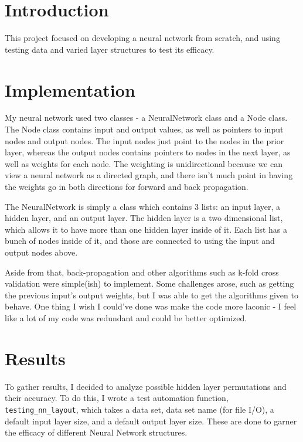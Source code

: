 \documentclass[12pt]{extarticle}
\begin{document}
\maketitle

\section{Introduction}
This project focused on developing a neural network from scratch, and using testing data and varied layer structures to test its efficacy.

\section{Implementation}
My neural network used two classes - a NeuralNetwork class and a Node class. The Node class contains input and output values, as well as pointers to input nodes and output nodes. The input nodes just point to the nodes in the prior layer, whereas the output nodes contains pointers to nodes in the next layer, as well as weights for each node. The weighting is unidirectional because we can view a neural network as a directed graph, and there isn't much point in having the weights go in both directions for forward and back propagation.

The NeuralNetwork is simply a class which contains 3 lists: an input layer, a hidden layer, and an output layer. The hidden layer is a two dimensional list, which allows it to have more than one hidden layer inside of it. Each list has a bunch of nodes inside of it, and those are connected to using the input and output nodes above.

Aside from that, back-propagation and other algorithms such as k-fold cross validation were simple(ish) to implement. Some challenges arose, such as getting the previous input's output weights, but I was able to get the algorithms given to behave. One thing I wish I could've done was make the code more laconic - I feel like a lot of my code was redundant and could be better optimized.

\section{Results}
To gather results, I decided to analyze possible hidden layer permutations and their accuracy. To do this, I wrote a test automation function, \verb$testing_nn_layout$, which takes a data set, data set name (for file I/O), a default input layer size, and a default output layer size. These are done to garner the efficacy of different Neural Network structures. 
\end{document}

